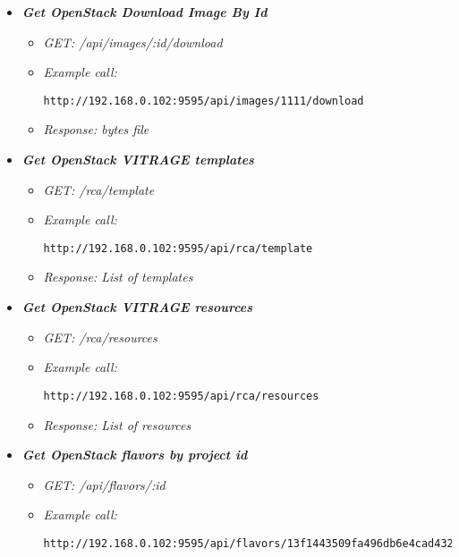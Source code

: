 \begin{itemize}

\item \textbf{\textit{Get OpenStack Download Image By Id}}
\begin{itemize}
\item \emph{GET: /api/images/:id/download}
\item \emph{Example call:}
 \begin{lstlisting}
http://192.168.0.102:9595/api/images/1111/download
\end{lstlisting}

\item \emph{Response: bytes file}
\end{itemize}



\item \textbf{\textit{Get OpenStack VITRAGE templates}}
\begin{itemize}
\item \emph{GET: /rca/template}
\item \emph{Example call:}
 \begin{lstlisting}
http://192.168.0.102:9595/api/rca/template
\end{lstlisting}
\item \emph{Response: List of templates}
\end{itemize}


\item \textbf{\textit{Get OpenStack VITRAGE resources}}
\begin{itemize}
\item \emph{GET: /rca/resources}
\item \emph{Example call:}
 \begin{lstlisting}
http://192.168.0.102:9595/api/rca/resources
\end{lstlisting}
\item \emph{Response: List of resources}
\end{itemize}


\item \textbf{\textit{Get OpenStack flavors by project id}}
\begin{itemize}
\item \emph{GET: /api/flavors/:id}
\item \emph{Example call:}
 \begin{lstlisting}
http://192.168.0.102:9595/api/flavors/13f1443509fa496db6e4cad43208170f
\end{lstlisting}


\end{itemize}
\end{itemize}
